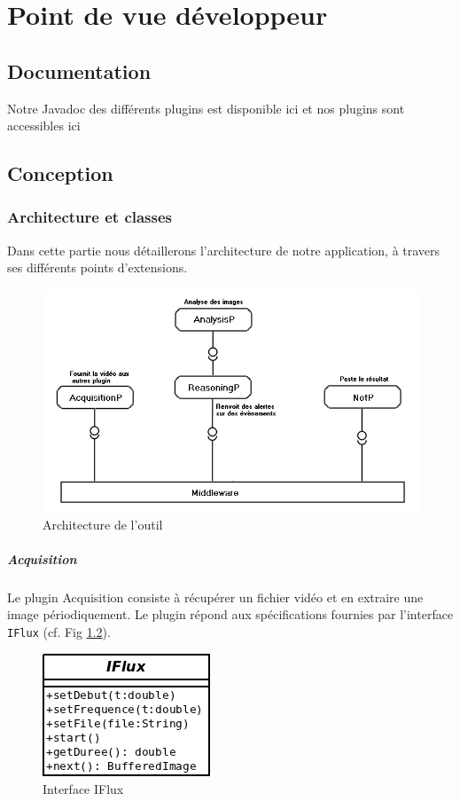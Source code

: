 \chapter{Point de vue développeur}

\section{Documentation}
Notre Javadoc des différents plugins est disponible ici \cite{doc} et nos plugins sont accessibles ici \cite{plug}

\section{Conception}
	\subsection{Architecture et classes}
	Dans cette partie nous détaillerons l'architecture de notre application, à travers ses différents points d'extensions.
	\begin{figure}[!htbp]
	  \centering
	  \includegraphics[scale=0.50]{img/archi}
	  \caption{Architecture de l'outil}
	  \label{fig:archi}
	\end{figure}


		\paragraph{Acquisition}
		Le plugin Acquisition consiste à récupérer un fichier vidéo et en extraire une image périodiquement. Le plugin répond aux spécifications fournies par l'interface \verb+IFlux+ (cf. Fig \ref{fig:IFlux}).
		\begin{figure}[htbp]
			\centering
			\includegraphics[scale=0.50]{img/IFlux}
			\caption{Interface IFlux}
			\label{fig:IFlux}
		\end{figure}

